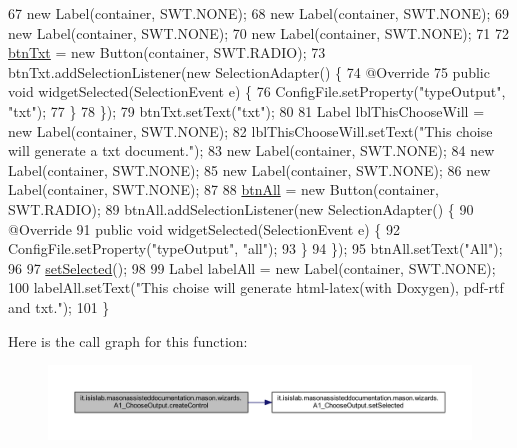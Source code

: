 \begin{DoxyCode}
67         \textcolor{keyword}{new} Label(container, SWT.NONE);
68         \textcolor{keyword}{new} Label(container, SWT.NONE);
69         \textcolor{keyword}{new} Label(container, SWT.NONE);
70         \textcolor{keyword}{new} Label(container, SWT.NONE);
71         
72         \hyperlink{classit_1_1isislab_1_1masonassisteddocumentation_1_1mason_1_1wizards_1_1_a1___choose_output_a7a3e59d93bfba5d422c70ffdaf34f8ae}{btnTxt} = \textcolor{keyword}{new} Button(container, SWT.RADIO);
73         btnTxt.addSelectionListener(\textcolor{keyword}{new} SelectionAdapter() \{
74             @Override
75             \textcolor{keyword}{public} \textcolor{keywordtype}{void} widgetSelected(SelectionEvent e) \{
76                 ConfigFile.setProperty(\textcolor{stringliteral}{"typeOutput"}, \textcolor{stringliteral}{"txt"});
77             \}
78         \});
79         btnTxt.setText(\textcolor{stringliteral}{"txt"});
80         
81         Label lblThisChooseWill = \textcolor{keyword}{new} Label(container, SWT.NONE);
82         lblThisChooseWill.setText(\textcolor{stringliteral}{"This choise will generate a txt document."});
83         \textcolor{keyword}{new} Label(container, SWT.NONE);
84         \textcolor{keyword}{new} Label(container, SWT.NONE);
85         \textcolor{keyword}{new} Label(container, SWT.NONE);
86         \textcolor{keyword}{new} Label(container, SWT.NONE);
87         
88         \hyperlink{classit_1_1isislab_1_1masonassisteddocumentation_1_1mason_1_1wizards_1_1_a1___choose_output_aebfe811a15807a6648df6d7cb9ce1196}{btnAll} = \textcolor{keyword}{new} Button(container, SWT.RADIO);
89         btnAll.addSelectionListener(\textcolor{keyword}{new} SelectionAdapter() \{
90             @Override
91             \textcolor{keyword}{public} \textcolor{keywordtype}{void} widgetSelected(SelectionEvent e) \{
92                 ConfigFile.setProperty(\textcolor{stringliteral}{"typeOutput"}, \textcolor{stringliteral}{"all"});
93             \}
94         \});
95         btnAll.setText(\textcolor{stringliteral}{"All"});
96         
97         \hyperlink{classit_1_1isislab_1_1masonassisteddocumentation_1_1mason_1_1wizards_1_1_a1___choose_output_a4602f301eef9ed9fbb73ef78b00ae401}{setSelected}();
98         
99         Label labelAll = \textcolor{keyword}{new} Label(container, SWT.NONE);
100         labelAll.setText(\textcolor{stringliteral}{"This choise will generate html-latex(with Doxygen), pdf-rtf and txt."});
101     \}
\end{DoxyCode}


Here is the call graph for this function\-:
\nopagebreak
\begin{figure}[H]
\begin{center}
\leavevmode
\includegraphics[width=350pt]{classit_1_1isislab_1_1masonassisteddocumentation_1_1mason_1_1wizards_1_1_a1___choose_output_a9f06e01c71cae4b98c300170ab2515a5_cgraph}
\end{center}
\end{figure}


